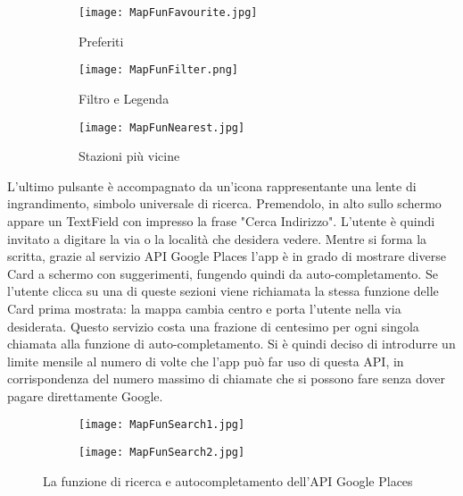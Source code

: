 \begin{figure}[!h]
    \centering
    \begin{subfigure}{0.3\linewidth}
        \texttt{[image: MapFunFavourite.jpg]}
        \caption{Preferiti}
    \end{subfigure}
    \begin{subfigure}{0.3\linewidth}
        \texttt{[image: MapFunFilter.png]}
        \caption{Filtro e Legenda}
        \label{filtro}
    \end{subfigure}
    \begin{subfigure}{0.3\linewidth}
        \texttt{[image: MapFunNearest.jpg]}
        \caption{Stazioni più vicine}
    \end{subfigure}
    \caption{}
\end{figure}

L'ultimo pulsante è accompagnato da un'icona rappresentante una lente di
ingrandimento, simbolo universale di ricerca. Premendolo, in alto sullo schermo
appare un TextField con impresso la frase "Cerca Indirizzo". L'utente è quindi
invitato a digitare la via o la località che desidera vedere. Mentre si forma la
scritta, grazie al servizio API Google Places l'app è in grado di mostrare
diverse Card a schermo con suggerimenti, fungendo quindi da auto-completamento.
Se l'utente clicca su una di queste sezioni viene richiamata la stessa funzione
delle Card prima mostrata: la mappa cambia centro e porta l'utente nella via
desiderata. Questo servizio costa una frazione di centesimo per ogni singola
chiamata alla funzione di auto-completamento. Si è quindi deciso di introdurre
un limite mensile al numero di volte che l'app può far uso di questa API, in
corrispondenza del numero massimo di chiamate che si possono fare senza dover
pagare direttamente Google.
\begin{figure}[!h]
    \centering
    \begin{subfigure}{0.33\linewidth}
        \texttt{[image: MapFunSearch1.jpg]}
    \end{subfigure}
    \begin{subfigure}{0.33\linewidth}
        \texttt{[image: MapFunSearch2.jpg]}
    \end{subfigure}
    \caption{La funzione di ricerca e autocompletamento dell'API Google Places}
\end{figure}

